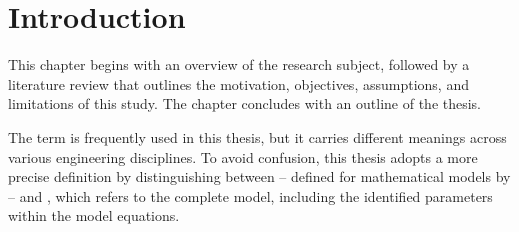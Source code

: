\chapter{Introduction}
This chapter begins with an overview of the research subject, followed by a literature review that outlines the motivation, objectives, assumptions, and limitations of this study. The chapter concludes with an outline of the thesis.

The term  is frequently used in this thesis, but it carries different meanings across various engineering disciplines. To avoid confusion, this thesis adopts a more precise definition by distinguishing between  -- defined for mathematical models by  -- and , which refers to the complete model, including the identified parameters within the model equations.







